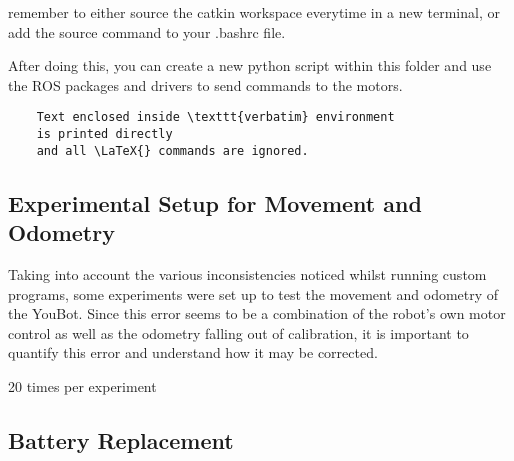 \documentclass[a4paper, 12pt]{article}
\newif\ifshownotes
\newcommand{\notes}[1]{\ifshownotes\textcolor{blue}{#1}\fi}
\begin{document}
    remember to either source the catkin workspace everytime in a new terminal, or add the source command to your .bashrc file.

    After doing this, you can create a new python script within this folder and use the ROS packages and drivers to send commands to the motors. 

    

    \begin{verbatim}
    Text enclosed inside \texttt{verbatim} environment 
    is printed directly 
    and all \LaTeX{} commands are ignored.
    \end{verbatim}


   
    \pagebreak

    \subsection{Experimental Setup for Movement and Odometry}

    \notes{here, ill discuss the experimental setup for testing movement and odometry.  this should include the two experiments of moving linearly and rotating, and discuss how error is calculated. probably discuss negative feedback and PID control as well, random, percentage, consistent error, etc.}

    Taking into account the various inconsistencies noticed whilst running custom programs, some experiments were set up to test the movement and odometry of the YouBot. Since this error seems to be a combination of the robot's own motor control as well as the odometry falling out of calibration, it is important to quantify this error and understand how it may be corrected. 



    \notes{different speeds? proportional or fixed error? does the odometry also drift?}

    20 times per experiment
    
    
    \pagebreak



    \subsection{Battery Replacement}



    \notes{draft 1, 11.05 12pm\\
    Here are some good web pages about the Slealed Lead Acid (SLA) batteries:
https://batterymasters.co.uk/blog/post/How%
and
https://www.power-sonic.com/blog/how-to-charge-a-lead-acid-battery/
and
https://www.powerstream.com/SLA.htm}
\end{document}
